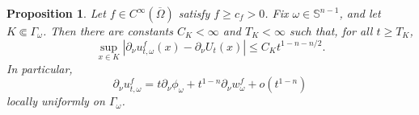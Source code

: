 \documentclass[11pt]{article}
\numberwithin{equation}{section}
\newtheorem{proposition}[theorem]{Proposition}
\newcommand{\Sn}{\mathbb S^{n-1}}
\begin{document}
\begin{proposition}\label{prop:boundary-normal-from-C0}
Let \(f\in C^\infty(\overline\Omega)\) satisfy \(f\ge c_f>0\).  Fix \(\omega\in\Sn\), and let \(K\Subset\Gamma_\omega\).  Then there are constants \(C_K<\infty\) and \(T_K<\infty\) such that, for all \(t\ge T_K\),
\begin{equation}\label{eq:boundary-normal-rate-from-C0}
    \sup_{x\in K}
    \left|
        \partial_\nu u_{t,\omega}^f(x)
        -\partial_\nu U_t(x)
    \right|
    \le
    C_K t^{1-n-n/2}.
\end{equation}
In particular,
\begin{equation}\label{eq:boundary-normal-asymptotic-proved}
    \partial_\nu u_{t,\omega}^f
    =
    t\partial_\nu\phi_\omega
    +
    t^{1-n}\partial_\nu w_\omega^f
    +
    o(t^{1-n})
\end{equation}
locally uniformly on \(\Gamma_\omega\).
\end{proposition}
\end{document}
